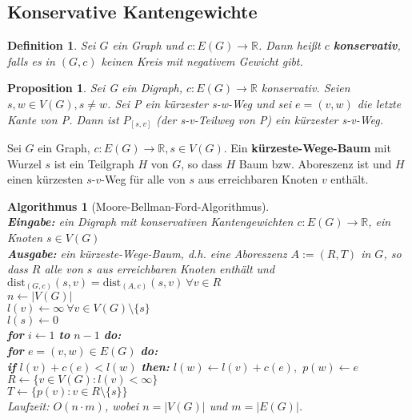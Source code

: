 \documentclass[12pt,a4paper]{article}
\theoremstyle{plain}
\newtheorem{Prop}[Theorem]{Proposition}
\newtheorem{Definition}[Theorem]{Definition}
\newtheorem{Algorithmus}[Theorem]{Algorithmus}
\newcommand{\herv}[1]{{\emph{\textbf{#1}}}}
\newcommand{\R}{\mathbb{R}}
\numberwithin{equation}{section}
\begin{document}
\subsection{Konservative Kantengewichte}
\begin{Definition}
Sei $G$ ein Graph und $c:E(G)\rightarrow \R$. Dann heißt $c$ \herv{konservativ}, falls es in $(G,c)$ keinen Kreis mit negativem Gewicht gibt.
\end{Definition}
\begin{Prop}
Sei G ein Digraph, $c:E(G)\rightarrow \R$ konservativ. Seien $s,w\in V(G), s\neq w$. Sei P ein kürzester s-w-Weg und sei $e=(v,w)$ die letzte Kante von P. Dann ist $P_{\left[s,v\right]}$ (der s-v-Teilweg von P) ein kürzester s-v-Weg.
\end{Prop}
Sei $G$ ein Graph, $c: E(G)\rightarrow \R, s\in V(G)$. Ein \textbf{kürzeste-Wege-Baum} mit Wurzel $s$ ist ein Teilgraph $H$ von $G$, so dass $H$ Baum bzw. Aboreszenz ist und $H$ einen kürzesten $s$-$v$-Weg für alle von $s$ aus erreichbaren Knoten $v$ enthält.
\begin{Algorithmus}[Moore-Bellman-Ford-Algorithmus]\\
\textbf{Eingabe:} ein Digraph mit konservativen Kantengewichten $c: E(G) \rightarrow \R$, ein Knoten $s\in V(G)$\\
\textbf{Ausgabe:} ein kürzeste-Wege-Baum, d.h. eine Aboreszenz $A:=(R,T)$ in $G$, so dass $R$ alle von $s$ aus erreichbaren Knoten enthält und $\text{dist}_{(G,c)}(s,v)=\text{dist}_{(A,c)}(s,v)\ \forall v\in R$\\
$n\leftarrow |V(G)|$\\
$l(v)\leftarrow \infty\ \forall v\in V(G)\setminus\{s\}$\\
$l(s)\leftarrow 0$\\
\textbf{for} $i \leftarrow 1$ \textbf{to} $n-1$ \textbf{do:}\\
\text{\qquad} \textbf{for} $e=(v,w)\in E(G)$ \textbf{do:}\\
\text{\qquad \qquad}\textbf{if} $l(v)+c(e)<l(w)$ \textbf{then:} $l(w)\leftarrow l(v)+c(e),$ $p(w)\leftarrow e$\\
$R\leftarrow \{v\in V(G): l(v)< \infty\}$\\
$T\leftarrow \{p(v): v\in R\setminus\{s\}\}$\\
Laufzeit: $O(n\cdot m)$, wobei $n=|V(G)|$ und $m=|E(G)|$.
\end{Algorithmus}
\end{document}
